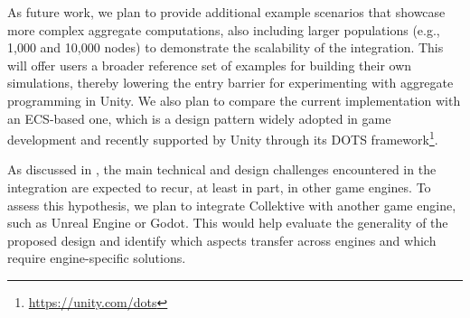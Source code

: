 \documentclass[runningheads]{llncs}
\begin{document}
As future work, 
we plan to provide additional example scenarios that showcase more complex aggregate computations,
also including larger populations (e.g., 1{,}000 and 10{,}000 nodes) to demonstrate the scalability of the integration.
%
This will offer users a broader reference set of examples for building their own simulations, 
thereby lowering the entry barrier for experimenting with aggregate programming in Unity.
%
We also plan to compare the current implementation with an \ac{ECS}-based one,
which is a design pattern widely adopted in game development and recently supported by Unity through its \ac{DOTS} framework\footnote{\url{https://unity.com/dots}}.

As discussed in ,
the main technical and design challenges encountered in the integration are expected to recur,
at least in part, in other game engines.
%
To assess this hypothesis,
we plan to integrate Collektive with another game engine, such as Unreal Engine or Godot.
%
This would help evaluate the generality of the proposed design and identify which aspects transfer across engines
and which require engine-specific solutions.



\end{document}
